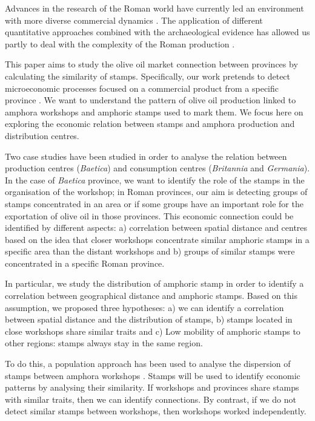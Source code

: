 \documentclass[review]{elsarticle}
\newcommand{\memo}[2]{\textcolor{#1}{#2}}
\newcommand{\xavi}[1]{\memo{magenta}{XRC: #1\\}}
\begin{document}
Advances in the research of the Roman world have currently led an environment with more diverse commercial dynamics \citep{duncan1982economy,
temin_economy_2006,
quantifyingwilson2009}. The application of different quantitative approaches combined with the archaeological evidence has allowed us partly to deal with the complexity of the Roman production \citep{brughmans_roman_2016,
orengo_seeds_2016,bayesian_2018,
coto-sarmiento_identifying_2018,
rubio-campillo_ecology_2018}.

This paper aims to study the olive oil market connection between provinces by calculating the similarity of stamps. Specifically, our work pretends to detect microeconomic processes focused on a commercial product from a specific province \citep{isaksen_network_2006}. We want to understand the pattern of olive oil production linked to amphora workshops and amphoric stamps used to mark them. We focus here on exploring the economic relation between stamps and amphora production and distribution centres. 

Two case studies have been studied in order to analyse the relation between production centres (\textit{Baetica}) and consumption centres (\textit{Britannia} and \textit{Germania}). In the case of \textit{Baetica} province, we want to identify the role of the stamps in the organisation of the workshop; in Roman provinces, our aim is detecting groups of stamps concentrated in an area or if some groups have an important role for the exportation of olive oil in those provinces. This economic connection could be identified by different aspects: a) correlation between spatial distance and centres based on the idea that closer workshops concentrate similar amphoric stamps in a specific area than the distant workshops and b) groups of similar stamps were concentrated in a specific Roman province. 

In particular, we study the distribution of amphoric stamp in order to identify a correlation between geographical distance and amphoric stamps. Based on this assumption, we proposed three hypotheses: a) we can identify a correlation between spatial distance and the distribution of stamps, b) stamps located in close workshops share similar traits and c) Low mobility of amphoric stamps to other regions: stamps always stay in the same region.  


To do this, a population approach has been used to analyse the dispersion of stamps between amphora workshops \citep{rubio-campillo_ecology_2018}. Stamps will be used to identify economic patterns by analysing their similarity. If workshops and provinces share stamps with similar traits, then we can identify connections. By contrast, if we do not detect similar stamps between workshops, then workshops worked independently. 
\end{document}
